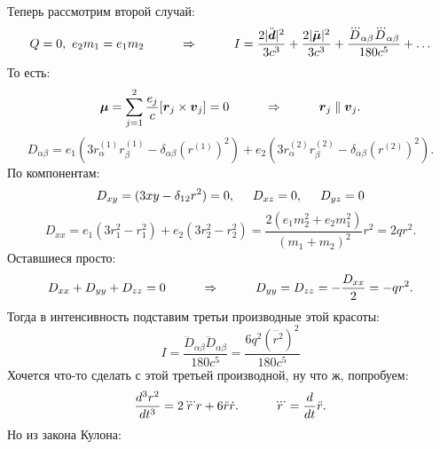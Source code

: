 Теперь рассмотрим второй случай:
\begin{equation*}
	Q = 0, \ e_2 m_1 = e_1 m_2
	\hspace{1 cm}
	\Rightarrow
	\hspace{1 cm}
	I = \frac{2 |\ddot{\mbox{\boldmath $d$}}|^2}{3 c^3} + \frac{2 |\ddot{\mbox{\boldmath $\mu$}}|^2}{3 c^3} + \frac{\dddot{D}_{\alpha\beta} \dddot{D}_{\alpha\beta}}{180 c^5} + \ldots
\end{equation*}
То есть:
\begin{equation*}
	\mbox{\boldmath $\mu$} = \sum_{j = 1}^2 \frac{e_j}{c}[\mbox{\boldmath $r$}_j \times \mbox{\boldmath $v$}_j] = 0
	\hspace{1 cm}
	\Rightarrow
	\hspace{1 cm}
	\mbox{\boldmath $r$}_j \parallel \mbox{\boldmath $v$}_j.
\end{equation*}
\begin{equation*}
	D_{\alpha\beta} = e_1 (3 r_\alpha^{(1)} r_\beta^{(1)} - \delta_{\alpha\beta} (r^{(1)})^2) + e_2 (3 r_\alpha^{(2)} r_\beta^{(2)} - \delta_{\alpha\beta} (r^{(2)})^2).
\end{equation*}
По компонентам:
\begin{equation*}
	D_{xy} = (3 x y - \delta_{1 2} r^2) = 0,
	\hspace{0.5 cm}
	D_{x z} = 0,
	\hspace{0.5 cm}
	D_{y z} = 0
\end{equation*}
\begin{equation*}
	D_{xx} = e_1 (3 r_1^2 - r_1^2) + e_2 (3 r_2^2 - r_2^2)
	=
	\frac{2 (e_1 m_2^2 + e_2 m_1^2)}{(m_1 + m_2)^2} r^2 = 2 q r^2.
\end{equation*}
Оставшиеся просто:
\begin{equation*}
	D_{xx} + D_{yy} + D_{zz} = 0
	\hspace{1 cm}
	\Rightarrow
	\hspace{1 cm}
	D_{yy} = D_{zz} = - \frac{D_{xx}}{2} = - q r^2.
\end{equation*}
Тогда в интенсивность подставим третьи производные этой красоты:
\begin{equation*}
	I = \frac{\dddot{D}_{\alpha\beta}\dddot{D}_{\alpha\beta}}{180 c^5}
	=
	\frac{6 q^2 (\dddot{r^2})^2}{180 c^5}
\end{equation*}
Хочется что-то сделать с этой третьей производной, ну что ж, попробуем:
\begin{equation*}
	\frac{d^3 r^2}{d t^3} = 2 \dddot{r} r + 6 \ddot{r} \dot{r}.
	\hspace{1 cm}
	\dddot{r} = \frac{d}{d t} \ddot{r}.
\end{equation*}
Но из закона Кулона:
